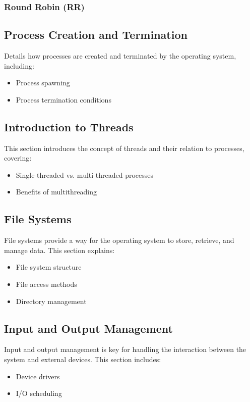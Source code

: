 \documentclass[12pt]{article}
\begin{document}
    \subsubsection{Round Robin (RR)} 


\subsection{Process Creation and Termination}
Details how processes are created and terminated by the operating system, including:
\begin{itemize}
    \item Process spawning
    \item Process termination conditions
\end{itemize}

\subsection{Introduction to Threads}
This section introduces the concept of threads and their relation to processes, covering:
\begin{itemize}
    \item Single-threaded vs. multi-threaded processes
    \item Benefits of multithreading
\end{itemize}

\subsection{File Systems}
File systems provide a way for the operating system to store, retrieve, and manage data. This section explains:
\begin{itemize}
    \item File system structure
    \item File access methods
    \item Directory management
\end{itemize}

\subsection{Input and Output Management}
Input and output management is key for handling the interaction between the system and external devices. This section includes:
\begin{itemize}
    \item Device drivers
    \item I/O scheduling
\end{itemize}
\end{document}
